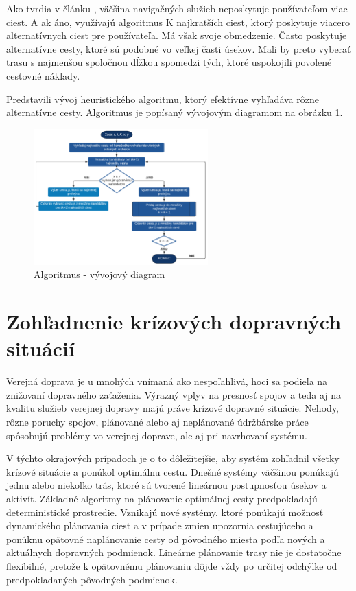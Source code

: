 Ako tvrdia v článku \cite{dissimilar}, väčšina navigačných služieb neposkytuje používateľom viac ciest. A ak áno, využívajú algoritmus K najkratších ciest, ktorý poskytuje viacero alternatívnych ciest pre používateľa. Má však svoje obmedzenie. Často poskytuje alternatívne cesty, ktoré sú podobné vo veľkej časti úsekov. Mali by preto vyberať trasu s najmenšou spoločnou dĺžkou spomedzi tých, ktoré uspokojili povolené cestovné náklady.

Predstavili vývoj heuristického algoritmu, ktorý efektívne vyhľadáva rôzne alternatívne cesty. Algoritmus je popísaný vývojovým diagramom na obrázku \ref{fig:flowchart}.

\begin{figure}[H]
\centerline{\includegraphics[width=0.6\textwidth]{images/flow-chart}}
\caption[Algoritmus - vývojový diagram]{Algoritmus - vývojový diagram}
\label{fig:flowchart}
\end{figure}
 

\section{Zohľadnenie krízových dopravných situácií}
Verejná doprava je u mnohých vnímaná ako nespoľahlivá, hoci sa podieľa na znižovaní dopravného zaťaženia. Výrazný vplyv na presnosť spojov a teda aj na kvalitu služieb verejnej dopravy majú práve krízové dopravné situácie. Nehody, rôzne poruchy spojov, plánované alebo aj neplánované údržbárske práce spôsobujú problémy vo verejnej doprave, ale aj pri navrhovaní systému.

V týchto okrajových prípadoch je o to dôležitejšie, aby systém zohľadnil všetky krízové situácie a ponúkol optimálnu cestu. Dnešné systémy väčšinou ponúkajú jednu alebo niekoľko trás, ktoré sú tvorené lineárnou postupnosťou úsekov a aktivít. Základné algoritmy na plánovanie optimálnej cesty predpokladajú deterministické prostredie. Vznikajú nové systémy, ktoré ponúkajú možnosť dynamického plánovania ciest a v prípade zmien upozornia cestujúceho a ponúknu opätovné naplánovanie cesty od pôvodného miesta podľa nových a aktuálnych dopravných podmienok. Lineárne plánovanie trasy nie je dostatočne flexibilné, pretože k opätovnému plánovaniu dôjde vždy po určitej odchýlke od predpokladaných pôvodných podmienok.

